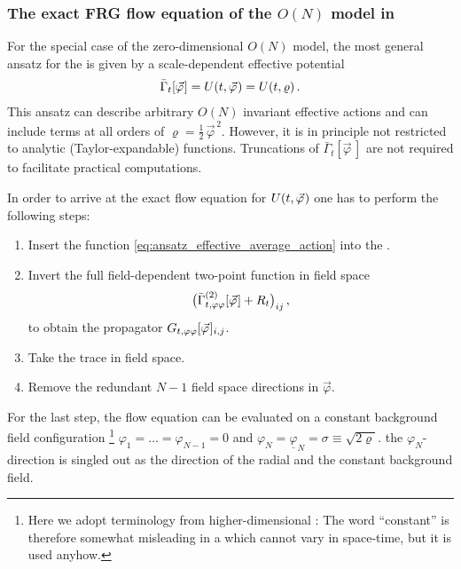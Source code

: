 \subsubsection{The exact FRG flow equation of the \texorpdfstring{$O(N)$}{O(N)} model in \texorpdfstring{\dzero{}}{d=0}}
\label{subsubsec:exact_flow_equation_potential}
For the special case of the zero-dimensional $O(N)$ model, the most general ansatz for the \eaa{} is given by a scale-dependent effective potential
\begin{align}
	\bar{\Gamma}_t [ \vec{\varphi} \mskip1.0mu ] = U ( t, \vec{\varphi} \mskip1.0mu ) = U ( t, \varrho )  \, .	\label{eq:ansatz_effective_average_action}
\end{align}
This ansatz can describe arbitrary $O(N)$ invariant effective actions and can include terms at all orders of $\varrho = \tfrac{1}{2} \, \vec{\varphi}^{\, 2}$.
However, it is in principle not restricted to analytic (Taylor-expandable) functions.
Truncations of $\bar{\Gamma}_t [ \vec{\varphi} \, ]$ are not required to facilitate practical computations.

In order to arrive at the exact flow equation for $U ( t, \vec{\varphi} \mskip1.0mu )$ one has to perform the following steps:
\begin{enumerate}
	\item	Insert the function \eqref{eq:ansatz_effective_average_action} into the \frgEquation{}.
	
	\item	Invert the full field-dependent two-point function in field space
		\begin{align}
			\big( \bar{\Gamma}^{(2)}_{t , \varphi \varphi} [ \vec{\varphi} \mskip1.0mu ] + R_t \big)_{i j} \, ,	\label{eq:full_two-point_function}
		\end{align}
	to obtain the propagator $G_{t,\varphi\varphi}[ \vec{\varphi}\mskip1.0mu ]_{i,j}$. 
	\item	Take the trace in field space.
	
	\item	Remove the redundant $N - 1$ field space directions in $\vec{\varphi}$.
\end{enumerate}
For the last step, the \frg{} flow equation can be evaluated on a constant background field configuration%
\footnote{%
	Here we adopt terminology from higher-dimensional \frg{}: The word ``constant'' is therefore somewhat misleading in a \qft{} which cannot vary in space-time, but it is used anyhow.
}
$\varphi_1 = \ldots = \varphi_{N - 1} = 0$ and $\varphi_N = \underline{\varphi}_N=\sigma\equiv\sqrt{2\varrho}$.
\WlogA{} the $\varphi_N$-direction is singled out as the direction of the radial \sigmaMode{} and the constant background field.

